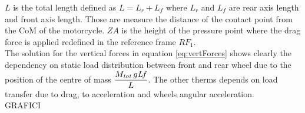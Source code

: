$L$ is the total length defined as $L= L_r+L_f$ where $L_r$ and $L_f$ are rear axis length and front axis length. Those are measure the distance of the contact point from the CoM of the motorcycle. $ZA$ is the height of the pressure point where the drag force is applied redefined in the reference frame $RF_1$.\\
The solution for the vertical forces in equation \ref{eq:vertForces} shows clearly the dependency on static load distribution between front and rear wheel due to the position of the centre of mass $\displaystyle{\frac {M_{{\it tot}}\,g{\it Lf}}{L}}$. The other therms depends on load transfer due to drag, to acceleration and wheels angular acceleration.\\
%
GRAFICI\\
%



